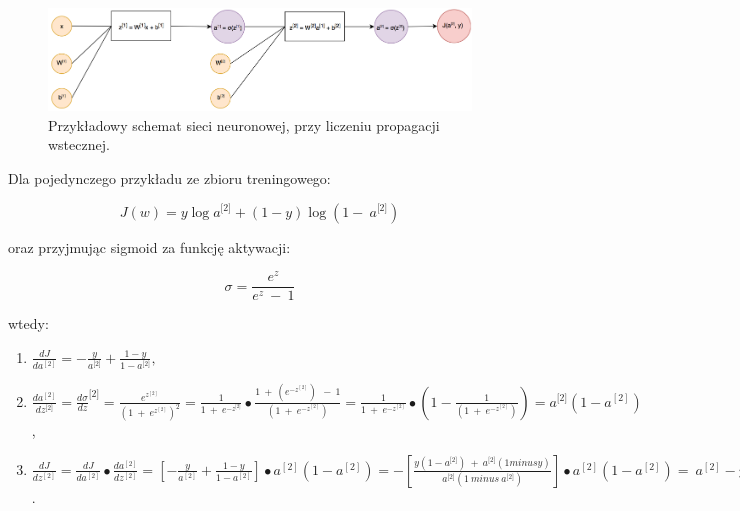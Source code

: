 \begin{figure}[ht]
\centerline{\includegraphics[scale=1]{resources/backprop_fc.png}}
\caption{Przykładowy schemat sieci neuronowej, przy liczeniu propagacji
wstecznej.}
\label{fig:backprop_fc}
\end{figure}

Dla pojedynczego przykładu ze zbioru treningowego:

\[J\left( w \right) = y\log{a^{\lbrack 2\rbrack} + \left( 1 - y \right)\log{(1 - \ a^{\lbrack 2\rbrack})}}\]

oraz przyjmując sigmoid za funkcję aktywacji:

\[\sigma = \frac{e^{z}}{e^{z}\  - \ 1}\]

wtedy:

\begin{enumerate}
\def\labelenumi{\arabic{enumi}.}
\item
  \(\frac{dJ}{da^{\left\lbrack 2 \right\rbrack}} = - \frac{y}{a^{\lbrack 2\rbrack}} + \frac{1 - y}{1 - a^{\lbrack 2\rbrack}},\)
\item
  \(\frac{da^{\left\lbrack 2 \right\rbrack}}{dz^{\lbrack 2\rbrack}} = \frac{d\sigma}{dz}^{\lbrack 2\rbrack} = \frac{e^{z^{\left\lbrack 2 \right\rbrack}}}{\left( 1\  + {\ e}^{z^{\left\lbrack 2 \right\rbrack}} \right)^{2}} = \frac{1}{1\  + {\ e}^{- z^{\lbrack 2\rbrack}}} \bullet \frac{1\  + \ \left( e^{- z^{\left\lbrack 2 \right\rbrack}} \right)\ \  - \ 1}{\left( 1\  + {\ e}^{- z^{\left\lbrack 2 \right\rbrack}} \right)} = \frac{1}{1\  + {\ e}^{- z^{\left\lbrack 2 \right\rbrack}}} \bullet (1 - \frac{1}{\left( 1\  + {\ e}^{- z^{\left\lbrack 2 \right\rbrack}} \right)}) = a^{\lbrack 2\rbrack}(1 - a^{\left\lbrack 2 \right\rbrack})\),
\item
  \(\frac{dJ}{dz^{\left\lbrack 2 \right\rbrack}} = \frac{dJ}{da^{\left\lbrack 2 \right\rbrack}} \bullet \frac{da^{\left\lbrack 2 \right\rbrack}}
  {dz^{\left\lbrack 2 \right\rbrack}} = \left\lbrack - \frac{y}{a^{\left\lbrack 2 \right\rbrack}} + \frac{1 - y}{1 - a^{\left\lbrack 2 \right\rbrack}}
  \right\rbrack \bullet a^{\left\lbrack 2 \right\rbrack}\left( 1 - a^{\left\lbrack 2 \right\rbrack} \right) = - \left\lbrack \frac{y\left( 1 - a^{\lbrack 2\rbrack} \right)\  + \ a^{\lbrack 2\rbrack}
  \left( 1 minus y \right)}{a^{\lbrack 2\rbrack}\left( 1\ minus\ a^{\lbrack 2\rbrack} \right)} \right\rbrack \bullet a^{\left\lbrack 2 \right\rbrack}
  \left( 1 - a^{\left\lbrack 2 \right\rbrack} \right) = \ a^{\left\lbrack 2 \right\rbrack} - y\).
\end{enumerate}

